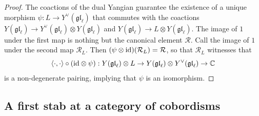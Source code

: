 \documentclass[11pt]{report}
\theoremstyle{definition}
\theoremstyle{remark}
\theoremstyle{remark}
\newcommand{\id}{\textnormal{id}}
\newcommand{\C}{\mathbb{C}}
\begin{document}
\begin{proof}
The coactions of the dual Yangian guarantee the existence of a unique morphism $\psi: L \to Y^\vee(\mathfrak{gl}_\ell)$ that commutes with the coactions $Y(\mathfrak{gl}_\ell) \to Y^\vee(\mathfrak{gl}_\ell) \otimes Y(\mathfrak{gl}_\ell)$ and $Y(\mathfrak{gl}_\ell) \to L \otimes Y(\mathfrak{gl}_\ell)$. The image of $1$ under the first map is nothing but the canonical element $\mathcal{R}$. Call the image of $1$ under the second map $\mathcal{R}_L$. Then $(\psi \otimes \id)(\mathcal{R}_L) = \mathcal{R}$, so that $\mathcal{R}_L$ witnesses that
\begin{equation*}
\langle \cdot,\cdot \rangle \circ (\id \otimes \psi): Y(\mathfrak{gl}_\ell) \otimes L \to Y(\mathfrak{gl}_\ell) \otimes Y^\vee(\mathfrak{gl}_\ell) \to \C
\end{equation*}
is a non-degenerate pairing, implying that $\psi$ is an isomorphism.
\end{proof}

\subsection{A first stab at a category of cobordisms}\label{subsection:naiveDef}
\end{document}
